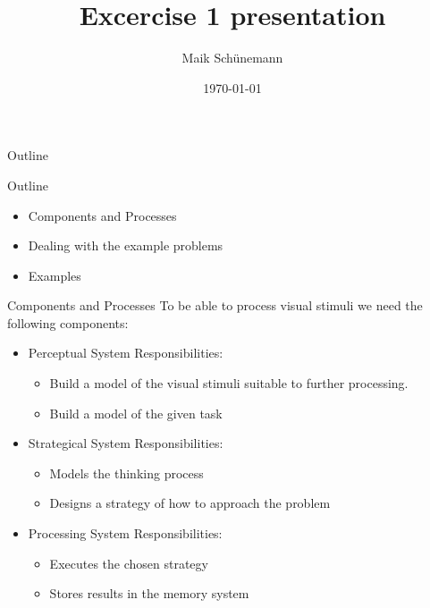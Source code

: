 \documentclass[presentation]{beamer}
\author{Maik Schünemann}
\date{\today}
\title{Excercise 1 presentation}
\begin{document}
\maketitle
\begin{frame}{Outline}
\tableofcontents
\end{frame}

\begin{frame}[label=sec-1]{Outline}
\begin{itemize}
\item Components and Processes
\item Dealing with the example problems
\item Examples
\end{itemize}
\end{frame}
\begin{frame}[label=sec-2]{Components and Processes}
To be able to process visual stimuli we need the following components:
\begin{itemize}
\item Perceptual System
Responsibilities:
\begin{itemize}
\item Build a model of the visual stimuli suitable to further processing.
\item Build a model of the given task
\end{itemize}
\item Strategical System
Responsibilities:
\begin{itemize}
\item Models the thinking process
\item Designs a strategy of how to approach the problem
\end{itemize}
\item Processing System
Responsibilities:
\begin{itemize}
\item Executes the chosen strategy
\item Stores results in the memory system
\end{itemize}
\end{itemize}
\end{frame}
\end{document}
